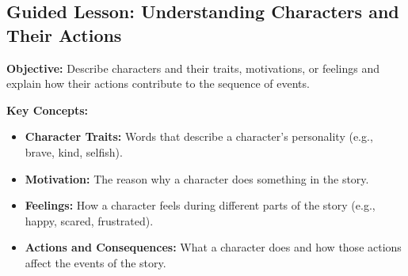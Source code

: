 \documentclass[12pt]{article}
\title{}
\date{}
\begin{document}
\subsection*{Guided Lesson: Understanding Characters and Their Actions}
\onehalfspacing

\begin{tcolorbox}[colframe=black!40, colback=gray!5, 
coltitle=black, colbacktitle=black!20, fonttitle=\bfseries\Large, 
title=Learning Objective, halign title=center, left=5pt, right=5pt, top=5pt, bottom=15pt]
\textbf{Objective:} Describe characters and their traits, motivations, or feelings and explain how their actions contribute to the sequence of events.
\end{tcolorbox}

\vspace{1em}

\begin{tcolorbox}[colframe=black!60, colback=white, 
coltitle=black, colbacktitle=black!15, fonttitle=\bfseries\Large, 
title=Key Concepts and Vocabulary, halign title=center, left=10pt, right=10pt, top=10pt, bottom=15pt]
\textbf{Key Concepts:}
\begin{itemize}
    \item \textbf{Character Traits:} Words that describe a character’s personality (e.g., brave, kind, selfish).
    \item \textbf{Motivation:} The reason why a character does something in the story.
    \item \textbf{Feelings:} How a character feels during different parts of the story (e.g., happy, scared, frustrated).
    \item \textbf{Actions and Consequences:} What a character does and how those actions affect the events of the story.
\end{itemize}
\end{tcolorbox}

\vspace{1em}
\end{document}
